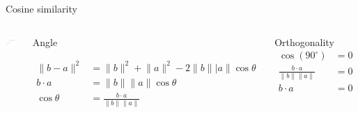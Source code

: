 \documentclass[
  10pt,
  ignorenonframetext,
  x11names, dvipsnames, bibspacing,natbib, table]{beamer}
\begin{document}
\begin{frame}{Cosine similarity}
\protect\hypertarget{cosine-similarity-3}{}
\begin{columns}
    

\begin{center}\includegraphics[width=1.15\linewidth]{presentationBoston_files/figure-beamer/cosine4-1} \end{center}




\footnotesize 


\begin{block}{Angle}

\begin{align*}
\lVert b - a \rVert^2 &  = \lVert  b \rVert^2 + \lVert a \rVert^2 - 
  2 \lVert b \rVert   \lvert  a \rVert  \cos \theta  \\
b \cdot a  & = \lVert b\rVert \lVert  a \rVert \cos \theta \\ 
\cos \theta & = \frac{b \cdot a}{\lVert b\rVert  \lVert  a \rVert }
\end{align*}

\end{block}


\pause 

\begin{block}{Orthogonality}
\begin{align*}
\cos ( 90^{\circ}) & = 0 \\ 
\frac{b \cdot a}{\lVert  b\rVert \lVert a \rVert} & = 0\\ 
 b \cdot a & = 0  
\end{align*}
\end{block}







\end{columns}
\end{frame}
\end{document}

